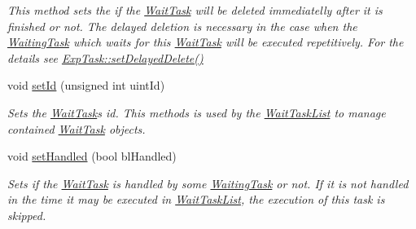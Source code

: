 \begin{DoxyCompactItemize}
\begin{DoxyCompactList}\small\item\em This method sets the if the \hyperlink{class_wait_task}{Wait\+Task} will be deleted immediatelly after it is finished or not. The delayed deletion is necessary in the case when the \hyperlink{class_waiting_task}{Waiting\+Task} which waits for this \hyperlink{class_wait_task}{Wait\+Task} will be executed repetitively. For the details see \hyperlink{class_exp_task_a2049ca37582a4b3250f3fc46ba19fe2a}{Exp\+Task\+::set\+Delayed\+Delete()} \end{DoxyCompactList}\item 
\hypertarget{class_wait_task_a25ff7bb1e0dee67244f6336e21840b18}{}void \hyperlink{class_wait_task_a25ff7bb1e0dee67244f6336e21840b18}{set\+Id} (unsigned int uint\+Id)\label{class_wait_task_a25ff7bb1e0dee67244f6336e21840b18}

\begin{DoxyCompactList}\small\item\em Sets the \hyperlink{class_wait_task}{Wait\+Task}\textquotesingle{}s id. This methods is used by the \hyperlink{class_wait_task_list}{Wait\+Task\+List} to manage contained \hyperlink{class_wait_task}{Wait\+Task} objects. \end{DoxyCompactList}\item 
\hypertarget{class_wait_task_ae128632bbf239153c64a5ba968643747}{}void \hyperlink{class_wait_task_ae128632bbf239153c64a5ba968643747}{set\+Handled} (bool bl\+Handled)\label{class_wait_task_ae128632bbf239153c64a5ba968643747}

\begin{DoxyCompactList}\small\item\em Sets if the \hyperlink{class_wait_task}{Wait\+Task} is handled by some \hyperlink{class_waiting_task}{Waiting\+Task} or not. If it is not handled in the time it may be executed in \hyperlink{class_wait_task_list}{Wait\+Task\+List}, the execution of this task is skipped. \end{DoxyCompactList}\end{DoxyCompactItemize}
